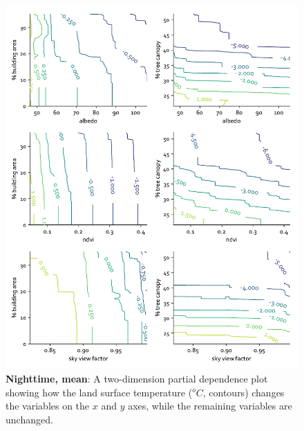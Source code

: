 \documentclass[final,3p,times,twocolumn,sort&compress]{elsarticle}
\begin{document}
\begin{figure}
    \centering
    \includegraphics[width=\linewidth]{fig/report/pdp_2d_night_100.pdf}
    \caption{
    \textbf{Nighttime, mean}: A two-dimension partial dependence plot showing how the land surface temperature ($^oC$, contours) changes the variables on the $x$ and $y$ axes, while the remaining variables are unchanged.
    }
    \label{fig:pdp_2dnight_100}
\end{figure}
\end{document}

